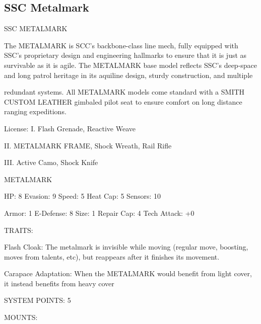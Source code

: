 
\subsection{SSC Metalmark}
                                                                                                                          
                                             SSC METALMARK  

The METALMARK is SCC’s backbone-class line mech, fully equipped with SSC’s proprietary design and  
engineering hallmarks to ensure that it is just as survivable as it is agile. The METALMARK base model  
reflects SSC’s deep-space and long patrol heritage in its aquiline design, sturdy construction, and multiple  

redundant systems. All METALMARK models come standard with a SMITH CUSTOM LEATHER gimbaled  
pilot seat to ensure comfort on long distance ranging expeditions.   

                                                                                                                     


                                                     License:  
 I. Flash Grenade, Reactive Weave
 
 II. METALMARK FRAME, Shock Wreath, Rail Rifle
 
 III. Active Camo, Shock Knife
 

                                                METALMARK 

  HP: 8          Evasion: 9                             Speed: 5            Heat Cap: 5         Sensors: 10 

 Armor: 1        E-Defense: 8                           Size: 1             Repair Cap: 4       Tech Attack:  
                                                                                                +0 

                                                     TRAITS: 

  Flash Cloak: The metalmark is invisible while moving (regular move, boosting, moves from talents, etc),  
  but reappears after it finishes its movement.
 
  Carapace Adaptation: When the METALMARK would benefit from light cover, it instead benefits from  
  heavy cover 

                                              SYSTEM POINTS: 5 

                                                    MOUNTS: 


